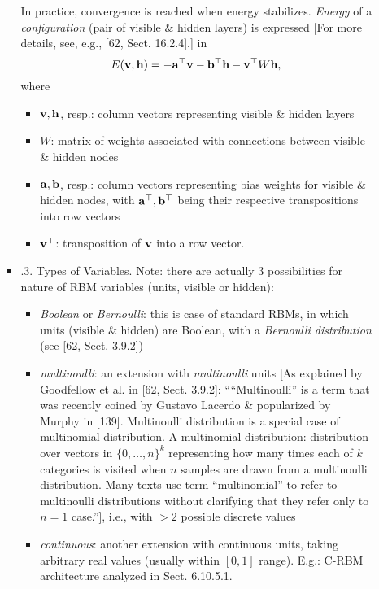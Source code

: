 \documentclass{article}
\begin{document}
\begin{itemize}
\begin{itemize}
\begin{itemize}
			In practice, convergence is reached when energy stabilizes. {\it Energy} of a {\it configuration} (pair of visible \& hidden layers) is expressed [For more details, see, e.g., [62, Sect. 16.2.4].] in
			\begin{equation*}
				E({\bf v},{\bf h}) = -{\bf a}^\top{\bf v} - {\bf b}^\top{\bf h} - {\bf v}^\top W{\bf h},
			\end{equation*}
			where
			\begin{itemize}
				\item ${\bf v},{\bf h}$, resp.: column vectors representing visible \& hidden layers
				\item $W$: matrix of weights associated with connections between visible \& hidden nodes
				\item ${\bf a},{\bf b}$, resp.: column vectors representing bias weights for visible \& hidden nodes, with ${\bf a}^\top,{\bf b}^\top$ being their respective transpositions into row vectors
				\item ${\bf v}^\top$: transposition of ${\bf v}$ into a row vector.
			\end{itemize}
			\item {.3. Types of Variables.} Note: there are actually 3 possibilities for nature of RBM variables (units, visible or hidden):
			\begin{itemize}
				\item {\it Boolean} or {\it Bernoulli}: this is case of standard RBMs, in which units (visible \& hidden) are Boolean, with a {\it Bernoulli distribution} (see [62, Sect. 3.9.2])
				\item {\it multinoulli}: an extension with {\it multinoulli} units [As explained by Goodfellow et al. in [62, Sect. 3.9.2]: ````Multinoulli'' is a term that was recently coined by {\sc Gustavo Lacerdo} \& popularized by {\sc Murphy} in [139]. Multinoulli distribution is a special case of multinomial distribution. A multinomial distribution: distribution over vectors in $\{0,\ldots,n\}^k$ representing how many times each of $k$ categories is visited when $n$ samples are drawn from a multinoulli distribution. Many texts use term ``multinomial'' to refer to multinoulli distributions without clarifying that they refer only to $n = 1$ case.''], i.e., with $> 2$ possible discrete values
				\item {\it continuous}: another extension with continuous units, taking arbitrary real values (usually within $[0,1]$ range). E.g.: C-RBM architecture analyzed in Sect. 6.10.5.1.
			\end{itemize}

\end{itemize}
\end{itemize}
\end{itemize}
\end{document}
